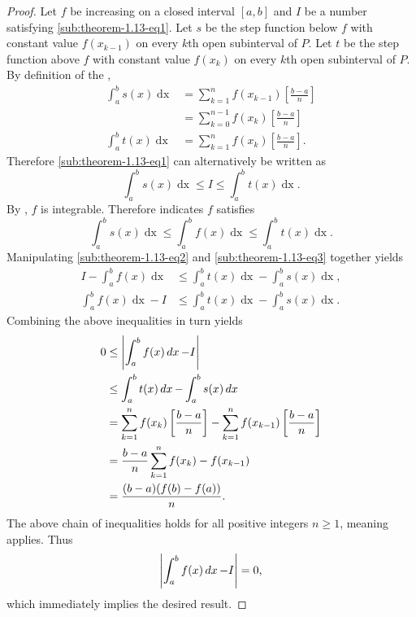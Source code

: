 \documentclass{report}
\begin{document}
\begin{proof}

  Let $f$ be increasing on a closed interval $[a, b]$ and $I$ be a number
    satisfying \eqref{sub:theorem-1.13-eq1}.
  Let $s$ be the step function below $f$ with constant value $f(x_{k-1})$
    on every $k$th open subinterval of $P$.
  Let $t$ be the step function above $f$ with constant value $f(x_k)$
    on every $k$th open subinterval of $P$.
  By definition of the ,
    \begin{align*}
      \int_a^b s(x) \mathop{dx}
        & = \sum_{k=1}^n f(x_{k-1})\left[\frac{b - a}{n}\right] \\
        & = \sum_{k=0}^{n-1} f(x_k)\left[\frac{b - a}{n}\right] \\
      \int_a^b t(x) \mathop{dx}
        & = \sum_{k=1}^n f(x_k)\left[\frac{b - a}{n}\right].
    \end{align*}
  Therefore \eqref{sub:theorem-1.13-eq1} can alternatively be written as
    \begin{equation}
      \label{sub:theorem-1.13-eq2}
      \int_a^b s(x) \mathop{dx} \leq I \leq \int_a^b t(x) \mathop{dx}.
    \end{equation}
  By , $f$ is integrable.
  Therefore  indicates $f$ satisfies
    \begin{equation}
      \label{sub:theorem-1.13-eq3}
      \int_a^b s(x) \mathop{dx}
        \leq \int_a^b f(x) \mathop{dx}
        \leq \int_a^b t(x) \mathop{dx}.
    \end{equation}
  Manipulating \eqref{sub:theorem-1.13-eq2} and \eqref{sub:theorem-1.13-eq3}
    together yields
    \begin{align*}
      I - \int_a^b f(x) \mathop{dx}
        & \leq \int_a^b t(x) \mathop{dx} - \int_a^b s(x) \mathop{dx}, \\
      \int_a^b f(x) \mathop{dx} - I
        & \leq \int_a^b t(x) \mathop{dx} - \int_a^b s(x) \mathop{dx}.
    \end{align*}
  Combining the above inequalities in turn yields
    \begin{align*}
      0
        & \leq \left|\int_a^b f(x) \mathop{dx} - I\right| \\
        & \leq \int_a^b t(x) \mathop{dx} - \int_a^b s(x) \mathop{dx} \\
        & = \sum_{k=1}^n f(x_k) \left[ \frac{b - a}{n} \right] -
            \sum_{k=1}^n f(x_{k-1}) \left[ \frac{b - a}{n} \right] \\
        & = \frac{b - a}{n} \sum_{k=1}^n f(x_k) - f(x_{k-1}) \\
        & = \frac{(b - a)(f(b) - f(a))}{n}.
    \end{align*}
  The above chain of inequalities holds for all positive integers $n \geq 1$,
    meaning  applies.
  Thus $$\left|\int_a^b f(x) \mathop{dx} - I\right| = 0,$$ which immediately implies
    the desired result.

\end{proof}
\end{document}
